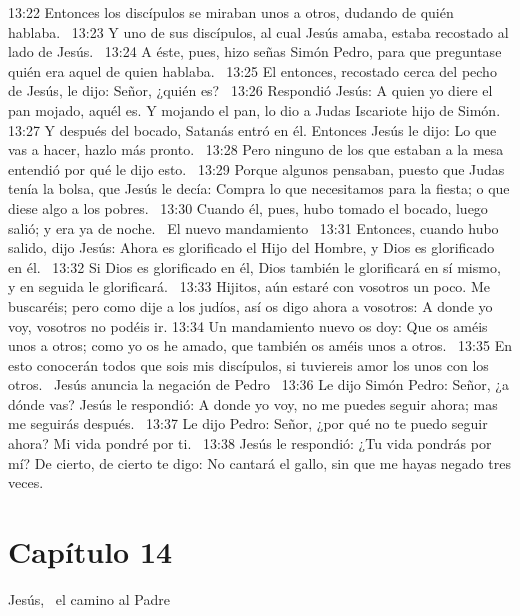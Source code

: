 13:22 Entonces los discípulos se miraban unos a otros, dudando de quién hablaba.  
13:23 Y uno de sus discípulos, al cual Jesús amaba, estaba recostado al lado de Jesús.  
13:24 A éste, pues, hizo señas Simón Pedro, para que preguntase quién era aquel de quien hablaba.  
13:25 El entonces, recostado cerca del pecho de Jesús, le dijo: Señor, ¿quién es?  
13:26 Respondió Jesús: A quien yo diere el pan mojado, aquél es. Y mojando el pan, lo dio a Judas Iscariote hijo de Simón.  
13:27 Y después del bocado, Satanás entró en él. Entonces Jesús le dijo: Lo que vas a hacer, hazlo más pronto.  
13:28 Pero ninguno de los que estaban a la mesa entendió por qué le dijo esto.  
13:29 Porque algunos pensaban, puesto que Judas tenía la bolsa, que Jesús le decía: Compra lo que necesitamos para la fiesta; o que diese algo a los pobres.  
13:30 Cuando él, pues, hubo tomado el bocado, luego salió; y era ya de noche.  
El nuevo mandamiento  
13:31 Entonces, cuando hubo salido, dijo Jesús: Ahora es glorificado el Hijo del Hombre, y Dios es glorificado en él.  
13:32 Si Dios es glorificado en él, Dios también le glorificará en sí mismo, y en seguida le glorificará.  
13:33 Hijitos, aún estaré con vosotros un poco. Me buscaréis; pero como dije a los judíos, así os digo ahora a vosotros: A donde yo voy, vosotros no podéis ir. 
13:34 Un mandamiento nuevo os doy: Que os améis unos a otros; como yo os he amado, que también os améis unos a otros.  
13:35 En esto conocerán todos que sois mis discípulos, si tuviereis amor los unos con los otros.  
Jesús anuncia la negación de Pedro   
13:36 Le dijo Simón Pedro: Señor, ¿a dónde vas? Jesús le respondió: A donde yo voy, no me puedes seguir ahora; mas me seguirás después.  
13:37 Le dijo Pedro: Señor, ¿por qué no te puedo seguir ahora? Mi vida pondré por ti.  
13:38 Jesús le respondió: ¿Tu vida pondrás por mí? De cierto, de cierto te digo: No cantará el gallo, sin que me hayas negado tres veces.  
\section*{Capítulo 14}
Jesús,  el camino al Padre  

